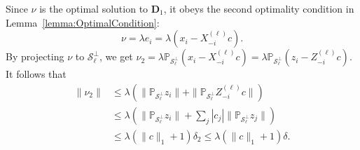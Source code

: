 \documentclass[twoside,11pt]{article}
\numberwithin{equation}{section}
\def\cP{\mathcal{P}}
\def\cS{\mathcal{S}}
\begin{document}

Since $\nu$ is the optimal solution to $\mathbf{D}_1$, it obeys the second optimality condition in Lemma~\ref{lemma:OptimalCondition}:
$$ \nu=\lambda e_i=\lambda(x_i-X^{(\ell)}_{-i}c). $$
By projecting $\nu$ to $\mathcal{S}^{\perp}_{\ell}$, we get
$\nu_2=\lambda \mathbb{P}_{\mathcal{S}_{\ell}^{\perp}}(x_i-X^{(\ell)}_{-i}c) = \lambda \mathbb{P}_{\mathcal{S}_{\ell}^{\perp}}(z_i-Z^{(\ell)}_{-i}c)$.
It follows that
\begin{align}
  \|\nu_2\|&\leq\lambda \left(\|\mathbb{P}_{\mathcal{S}_{\ell}^{\perp}}z_i\|+\|\mathbb{P}_{\mathcal{S}_{\ell}^{\perp}}Z^{(\ell)}_{-i}c\|\right)\nonumber\\
  & \leq \lambda\left( \|\mathbb{P}_{\mathcal{S}_{\ell}^{\perp}}z_i\| + \sum_{j} |c_j|\|\mathbb{P}_{\mathcal{S}_{\ell}^{\perp}}z_j\|\right) \nonumber\\
  & \leq \lambda (\|c\|_1+1)\delta_2 \leq \lambda (\|c\|_1+1)\delta. \label{eq:bounding_nu2}
\end{align}
\end{document}
